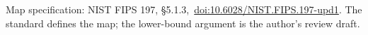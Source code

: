 \documentclass[11pt,letterpaper]{article}
\begin{document}
\vfill
{\footnotesize\color{muted} Map specification: NIST FIPS 197, \S5.1.3,\
\href{https://doi.org/10.6028/NIST.FIPS.197-upd1}{doi:10.6028/NIST.FIPS.197-upd1}. The standard defines the map; the lower-bound argument is the author's review draft.}
\clearpage
\begingroup
\renewcommand{\contentsname}{Contents}
\small
\tableofcontents
\endgroup
\clearpage


\end{document}
